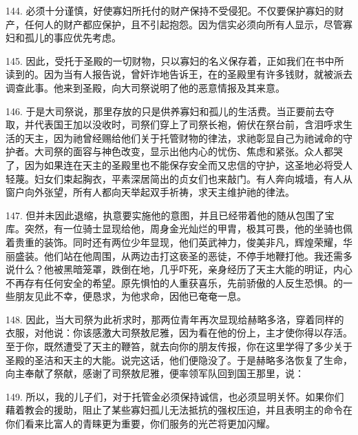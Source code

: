 144. 必须十分谨慎，好使寡妇所托付的财产保持不受侵犯。不仅要保护寡妇的财产，任何人的财产都应保护，且不引起抱怨。因为信实必须向所有人显示，尽管寡妇和孤儿的事应优先考虑。\par

145. 因此，受托于圣殿的一切财物，只以寡妇的名义保存着，正如我们在书中所读到的。因为当有人报告说，曾奸诈地告诉王，在的圣殿里有许多钱财，就被派去调查此事。他来到圣殿，向大司祭说明了他的恶意情报及其来意。\par

146. 于是大司祭说，那里存放的只是供养寡妇和孤儿的生活费。当正要前去夺取，并代表国王加以没收时，司祭们穿上了司祭长袍，俯伏在祭台前，含泪呼求生活的天主，因为祂曾经赐给他们关于托管财物的律法，求祂彰显自己为祂诫命的守护者。大司祭的面容与神色改变，显示出他内心的忧伤、焦虑和紧张。众人都哭了，因为如果连在天主的圣殿里也不能保存安全而又忠信的守护，这圣地必将受人轻蔑。妇女们束起胸衣，平素深居简出的贞女们也来敲门。有人奔向城墙，有人从窗户向外张望，所有人都向天举起双手祈祷，求天主维护祂的律法。\par

147. 但并未因此退缩，执意要实施他的意图，并且已经带着他的随从包围了宝库。突然，有一位骑士显现给他，周身金光灿烂的甲胄，极其可畏，他的坐骑也佩着贵重的装饰。同时还有两位少年显现，他们英武神力，俊美非凡，辉煌荣耀，华丽盛装。他们站在他周围，从两边击打这亵圣的恶徒，不停手地鞭打他。我还需多说什么？他被黑暗笼罩，跌倒在地，几乎吓死，亲身经历了天主大能的明证，内心不再存有任何安全的希望。原先惧怕的人重获喜乐，先前骄傲的人反生恐惧。的一些朋友见此不幸，便恳求，为他求命，因他已奄奄一息。\par

148. 因此，当大司祭为此祈求时，那两位青年再次显现给赫略多洛，穿着同样的衣服，对他说：你该感激大司祭敖尼雅，因为看在他的份上，主才使你得以存活。至于你，既然遭受了天主的鞭笞，就去向你的朋友传报，你在这里学得了多少关于圣殿的圣洁和天主的大能。说完这话，他们便隐没了。于是赫略多洛恢复了生命，向主奉献了祭献，感谢了司祭敖尼雅，便率领军队回到国王那里，说：\par

149. 所以，我的儿子们，对于托管金必须保持诚信，也必须显明关怀。如果你们藉着教会的援助，阻止了某些寡妇孤儿无法抵抗的强权压迫，并且表明主的命令在你们看来比富人的青睐更为重要，你们服务的光芒将更加闪耀。\par

